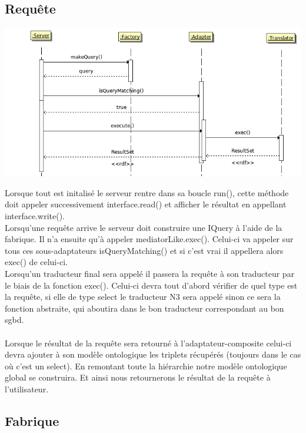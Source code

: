 \documentclass[12pt]{article}
\begin{document}
\subsection{Requête}

\begin{center}
	\includegraphics[scale=0.60]{images/sequence_requete.png}
\end{center}

Lorsque tout est initalisé le serveur rentre dans sa boucle run(), cette méthode doit appeler successivement interface.read() et afficher le résultat en appellant interface.write(). \\

\indent Lorsqu'une requête arrive le serveur doit construire une IQuery à l'aide de la fabrique. Il n'a ensuite qu'à appeler mediatorLike.exec(). Celui-ci va appeler sur tous ces sous-adaptateurs isQueryMatching() et si c'est vrai il appellera alors exec() de celui-ci. \\
\indent Lorsqu'un traducteur final sera appelé il passera la requête à son traducteur par le biais de la fonction exec(). Celui-ci devra tout d'abord vérifier de quel type est la requête, si elle de type select le traducteur N3 sera appelé sinon ce sera la fonction abstraite, qui aboutira dans le bon traducteur correspondant au bon sgbd. \\

\\ Lorsque le résultat de la requête sera retourné à l'adaptateur-composite celui-ci devra ajouter à son modèle ontologique les triplets récupérés (toujours dans le cas où c'est un select). En remontant toute la hiérarchie notre modèle ontologique global se construira. Et ainsi nous retournerons le résultat de la requête à l'utilisateur.

\subsection{Fabrique}
\end{document}
